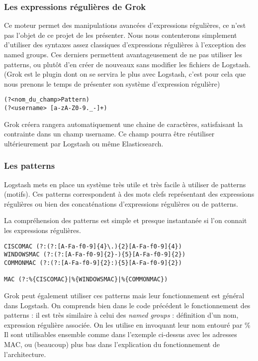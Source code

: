 \subsubsection{Les expressions régulières de Grok}
Ce moteur permet des manipulations avancées d'expressions régulières, ce n'est pas 
l'objet de ce projet de les présenter. Nous nous contenterons simplement d'utiliser
des syntaxes assez classiques d'expressions régulières à l'exception des named groups. 
Ces derniers permettent avantageusement de ne pas utiliser les patterns, ou plutôt d'en créer
de nouveaux sans modifier les fichiers de Logstash.
{\footnotesize(Grok est le plugin dont on se servira le plus avec Logstash, c'est 
pour cela que nous prenons le temps de présenter son système d'expression régulière)}


\begin{lstlisting}[style=logstash,label={lst:grokregex1},caption={Named group}]
(?<nom_du_champ>Pattern) 
(?<username> [a-zA-Z0-9._-]+)
\end{lstlisting}

Grok créera rangera automatiquement une chaine de caractères, satisfaisant la contrainte 
\ipath{/[a-zA-Z0-9.\_-]+/}  dans un champ  username. 
Ce champ pourra être réutiliser ultérieurement par Logstash ou même Elasticsearch.


\subsubsection{Les patterns}
Logstash mets en place un système très utile et très facile à utiliser de patterns 
(motifs). Ces patterns correspondent à des mots clefs représentant des expressions 
régulières ou bien des concaténations d'expressions régulières ou de patterns.

La compréhension des patterns est simple et presque instantanée si l'on connait les
expressions régulières.
\begin{lstlisting}[style=logstash,label={lst:patternsexplication1},caption={Exemple de définition et d'utilisation de Patterns}]
CISCOMAC (?:(?:[A-Fa-f0-9]{4}\.){2}[A-Fa-f0-9]{4})
WINDOWSMAC (?:(?:[A-Fa-f0-9]{2}-){5}[A-Fa-f0-9]{2})
COMMONMAC (?:(?:[A-Fa-f0-9]{2}:){5}[A-Fa-f0-9]{2})

MAC (?:%{CISCOMAC}|%{WINDOWSMAC}|%{COMMONMAC})
\end{lstlisting}

Grok peut également utiliser ces patterns mais leur fonctionnement est général dans
Logstash.
On comprends bien dans le code précédent le fonctionnement des patterns : il est
très similaire à celui des \textit{named groups} : définition d'un nom, expression
régulière associée. On les utilise en invoquant leur nom entouré par \%{} 
Il sont utilisables ensemble comme dans l'exemple ci-dessus avec les adresses MAC,
ou (beaucoup) plus bas dans l'explication du fonctionnement de l'architecture.

